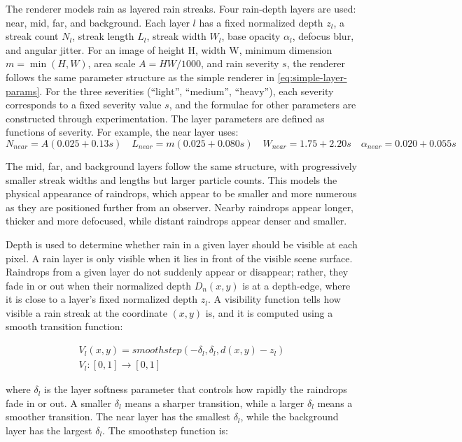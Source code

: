 \documentclass[10pt,letterpaper]{article}
\begin{document}
The renderer models rain as layered rain streaks. Four rain-depth layers are used: near, mid, far, and background.
Each layer $l$ has a fixed normalized depth $z_l$, a streak count $N_l$, streak length $L_l$, streak width $W_l$, base opacity $\alpha_l$, 
defocus blur, and angular jitter. For an image of height H, width W, minimum dimension $m = \min(H, W)$, 
area scale $A=HW/1000$, and rain severity $s$, the renderer follows the same parameter structure as the simple renderer in \autoref{eq:simple-layer-params}. 
For the three severities (``light'', ``medium'', ``heavy''), each severity corresponds to a fixed severity value $s$, and the formulae for other parameters are constructed through experimentation. 
The layer parameters are defined as functions of severity. For example, 
the near layer uses:
\[
N_{near}=A(0.025+0.13s) \quad L_{near}=m(0.025+0.080s) \quad W_{near}=1.75+2.20s \quad \alpha_{near}=0.020+0.055s
\]

The mid, far, and background layers follow the same structure, with progressively smaller streak widths and lengths but larger particle counts.
This models the physical appearance of raindrops, which appear to be smaller and more numerous as they are positioned further from an observer. 
Nearby raindrops appear longer, thicker and more defocused, while distant raindrops appear denser and smaller.

Depth is used to determine whether rain in a given layer should be visible at each pixel. A rain layer is only visible when it lies in front of the visible
scene surface. Raindrops from a given layer do not suddenly appear or disappear; rather, they fade in or out when their normalized depth $D_n(x,y)$ is at a depth-edge, where it is 
close to a layer's fixed normalized depth $z_l$. A visibility function tells how visible a rain streak at the coordinate $(x,y)$ is, and it is computed using a smooth transition function:

\begin{equation}
\begin{aligned}
V_l(x,y)=smoothstep(-\delta_l, \delta_l, d(x,y)-z_l)\\
V_l: [0,1]\rightarrow[0,1]
\end{aligned}
\label{eq:depth-layer-visibility}
\end{equation}

where $\delta_l$ is the layer softness parameter that controls how rapidly the raindrops fade in or out. A smaller $\delta_l$ means 
a sharper transition, while a larger $\delta_l$ means a smoother transition. The near layer has the smallest $\delta_l$, while the background layer has the largest
$\delta_l$. The smoothstep function is:
\end{document}
